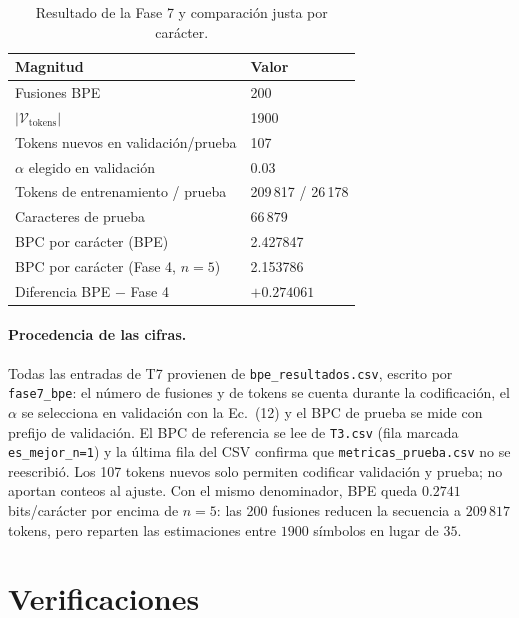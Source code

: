 \documentclass[11pt,letterpaper]{article}
\begin{document}
	\begin{table}[htbp]
		\centering
		\caption{Resultado de la Fase 7 y comparación justa por carácter.}
		\label{tab:T7}
		\begin{tabular}{l l}
			\toprule
			Magnitud & Valor \\
			\midrule
			Fusiones BPE & 200 \\
			$|\mathcal{V}_{\text{tokens}}|$ & 1900 \\
			Tokens nuevos en validación/prueba & 107 \\
			$\alpha$ elegido en validación & 0.03 \\
			Tokens de entrenamiento / prueba & 209\,817 / 26\,178 \\
			Caracteres de prueba & $66\,879$ \\
			BPC por carácter (BPE) & 2.427847 \\
			BPC por carácter (Fase 4, $n=5$) & 2.153786 \\
			Diferencia BPE $-$ Fase 4 & $+0.274061$ \\
			\bottomrule
		\end{tabular}
	\end{table}
	
	\paragraph{Procedencia de las cifras.}
	Todas las entradas de T7 provienen de \texttt{bpe\_resultados.csv}, escrito por \texttt{fase7\_bpe}: el número de fusiones y de tokens se cuenta durante la codificación, el $\alpha$ se selecciona en validación con la Ec.~(12) y el BPC de prueba se mide con prefijo de validación. El BPC de referencia se lee de \texttt{T3.csv} (fila marcada \texttt{es\_mejor\_n=1}) y la última fila del CSV confirma que \texttt{metricas\_prueba.csv} no se reescribió. Los 107 tokens nuevos solo permiten codificar validación y prueba; no aportan conteos al ajuste. Con el mismo denominador, BPE queda $0.2741$ bits/carácter por encima de $n=5$: las 200 fusiones reducen la secuencia a $209\,817$ tokens, pero reparten las estimaciones entre $1900$ símbolos en lugar de $35$.
	
	
	\section{Verificaciones}
\end{document}
